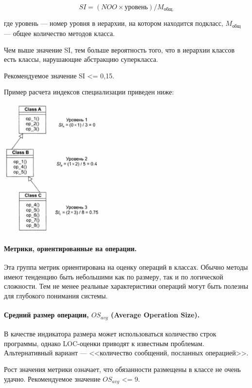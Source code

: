\documentclass{../../text-style}
\begin{document}
$$SI = (NOO \times \text{уровень}) / M_\text{общ.}$$

где уровень --- номер уровня в иерархии, на котором находится подкласс, $M_{\text{общ}}$ --- общее количество методов класса.

Чем выше значение SI, тем больше вероятность того, что в иерархии классов есть классы, нарушающие абстракцию суперкласса.

Рекомендуемое значение SI <= 0,15.

Пример расчета индексов специализации приведен ниже:

\begin{center}
    \includegraphics[width=0.4\textwidth]{siCalculation.png}
\end{center}

\paragraph{Метрики, ориентированные на операции.} Эта группа метрик ориентирована на оценку операций в классах. Обычно методы имеют тенденцию быть небольшими как по размеру, так и по логической сложности. Тем не менее реальные характеристики операций могут быть полезны для глубокого понимания системы.

\paragraph{Средний размер операции, $OS_{avg}$ (Average Operation Size).} В качестве индикатора размера может использоваться количество строк программы, однако LOC-оценки приводят к известным проблемам. Альтернативный вариант --- <<количество сообщений, посланных операцией>>.

Рост значения метрики означает, что обязанности размещены в классе не очень удачно. Рекомендуемое значение $OS_{avg}$ <= 9.
\end{document}
